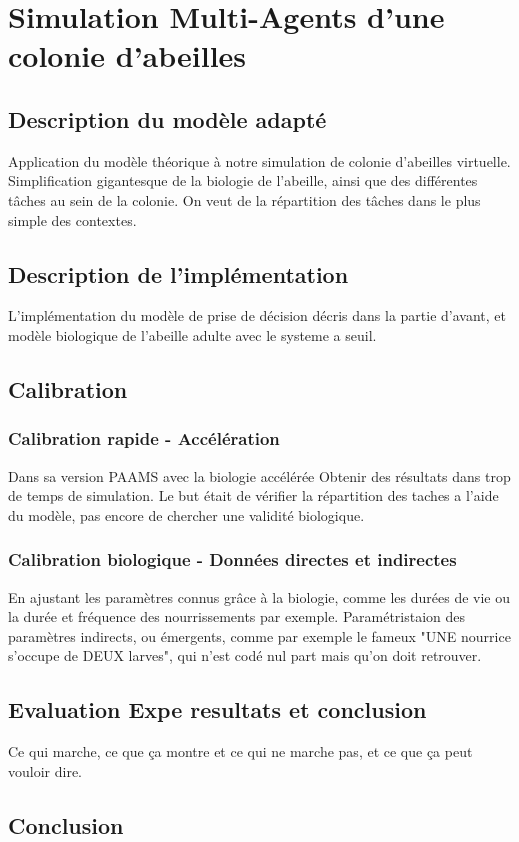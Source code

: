 \documentclass[11pt,a4paper]{report}
\begin{document}
\chapter{Simulation Multi-Agents d'une colonie d'abeilles}
	\section{Description du modèle adapté}
		Application du modèle théorique à notre simulation de colonie d'abeilles virtuelle.
		Simplification gigantesque de la biologie de l'abeille, ainsi que des différentes tâches au sein de la colonie.
		On veut de la répartition des tâches dans le plus simple des contextes.
	\section{Description de l'implémentation}
		L'implémentation du modèle de prise de décision décris dans la partie d'avant, et modèle biologique de l'abeille adulte avec le systeme a seuil.
	\section{Calibration}
		\subsection{Calibration rapide - Accélération}
			Dans sa version PAAMS avec la biologie accélérée
			Obtenir des résultats dans trop de temps de simulation. Le but était de vérifier la répartition des taches a l'aide du modèle, pas encore de chercher une validité biologique.
		\subsection{Calibration biologique - Données directes et indirectes}
			En ajustant les paramètres connus grâce à la biologie, comme les durées de vie ou la durée et fréquence des nourrissements par exemple.
			Paramétristaion des paramètres indirects, ou émergents, comme par exemple le fameux "UNE nourrice s'occupe de DEUX larves", qui n'est codé nul part mais qu'on doit retrouver.
	\section{Evaluation Expe resultats et conclusion}
		Ce qui marche, ce que ça montre et ce qui ne marche pas, et ce que ça peut vouloir dire.
			
	\section*{Conclusion}
\end{document}
